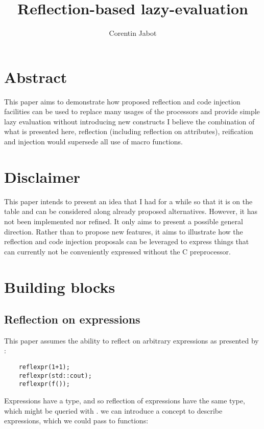 \documentclass{wg21}
\title{Reflection-based lazy-evaluation}
\author{Corentin Jabot}{corentin.jabot@gmail.com}
\begin{document}
\maketitle


\section{Abstract}

This paper aims to demonstrate how proposed reflection and code injection facilities can be used to replace many usages of the processors
and provide simple lazy evaluation without introducing new constructs
I believe the combination of what is presented here, reflection (including reflection on attributes), reification and injection would supersede all use of macro functions.

\section{Disclaimer}

This paper intends to present an idea that I had for a while so that it is on the table and can be considered along already proposed alternatives.
However, it has not been implemented nor refined. It only aims to present a possible general direction.
Rather than to propose new features, it aims to illustrate how the reflection and code injection proposals can be leveraged to express things that can currently
not be conveniently expressed without the C preprocessor. 

\section{Building blocks}

\subsection{Reflection on expressions}

This paper assumes the ability to reflect on arbitrary expressions as presented by \cite{P1240R1}:
\begin{lstlisting}
    reflexpr(1+1);
    reflexpr(std::cout);
    reflexpr(f());
\end{lstlisting}

Expressions have a type, and so reflection of expressions have the same type, which might be queried with .
we can introduce a concept to describe expressions, which we could pass to  functions:
\end{document}
